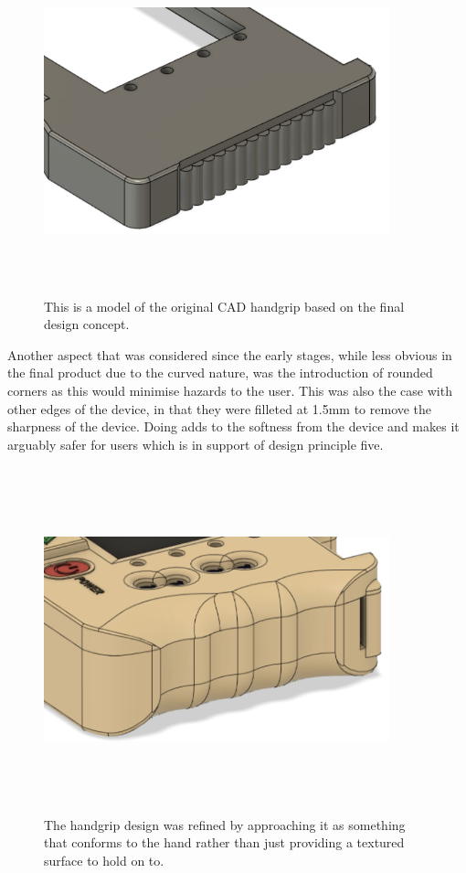 \begin{figure} [h]
    \centering
    \includegraphics[width=10cm,height=10cm,keepaspectratio]{Figures/handgrip_original.png}
    \caption{This is a model of the original CAD handgrip based on the final design concept.}
    \label{fig:Design_3}
\end{figure}

Another aspect that was considered since the early stages, while less obvious in the final product due to the curved nature, was the introduction of rounded corners as this would minimise hazards to the user.
This was also the case with other edges of the device, in that they were filleted at 1.5mm to remove the sharpness of the device.
Doing adds to the softness from the device and makes it arguably safer for users which is in support of design principle five.

\begin{figure} [h]
    \centering
    \includegraphics[width=10cm,height=10cm,keepaspectratio]{Figures/handgrip_final.png}
    \caption{The handgrip design was refined by approaching it as something that conforms to the hand rather than just providing a textured surface to hold on to.}
    \label{fig:Design_3}
\end{figure}

